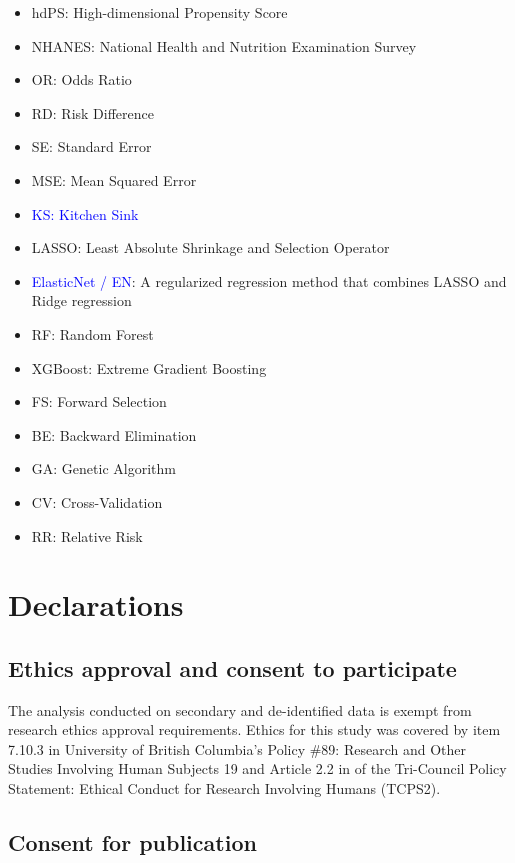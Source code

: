\documentclass[sn-vancouver,Numbered,lineno,pdflatex]{sn-jnl}
\providecommand{\tightlist}{%
  \setlength{\itemsep}{0pt}\setlength{\parskip}{0pt}}
\begin{document}
\begin{itemize}
\tightlist
\item
  hdPS: High-dimensional Propensity Score
\item
  NHANES: National Health and Nutrition Examination Survey
\item
  OR: Odds Ratio
\item
  RD: Risk Difference
\item
  SE: Standard Error
\item
  MSE: Mean Squared Error
\item
  \textcolor{blue}{KS: Kitchen Sink}
\item
  LASSO: Least Absolute Shrinkage and Selection Operator
\item
  \textcolor{blue}{ElasticNet / EN}: A regularized regression method
  that combines LASSO and Ridge regression
\item
  RF: Random Forest
\item
  XGBoost: Extreme Gradient Boosting
\item
  FS: Forward Selection
\item
  BE: Backward Elimination
\item
  GA: Genetic Algorithm
\item
  CV: Cross-Validation
\item
  RR: Relative Risk
\end{itemize}

\section*{Declarations}\label{declarations}

\subsection*{Ethics approval and consent to
participate}\label{ethics-approval-and-consent-to-participate}

The analysis conducted on secondary and de-identified data is exempt
from research ethics approval requirements. Ethics for this study was
covered by item 7.10.3 in University of British Columbia's Policy \#89:
Research and Other Studies Involving Human Subjects 19 and Article 2.2
in of the Tri-Council Policy Statement: Ethical Conduct for Research
Involving Humans (TCPS2).

\subsection*{Consent for publication}\label{consent-for-publication}
\end{document}
